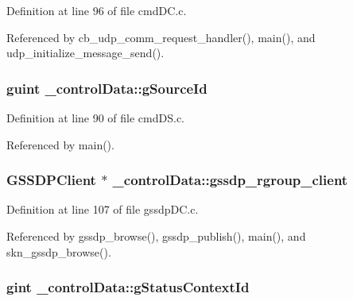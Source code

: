 Definition at line 96 of file cmd\+D\+C.\+c.



Referenced by cb\+\_\+udp\+\_\+comm\+\_\+request\+\_\+handler(), main(), and udp\+\_\+initialize\+\_\+message\+\_\+send().

\subsubsection[{\texorpdfstring{g\+Source\+Id}{gSourceId}}]{\setlength{\rightskip}{0pt plus 5cm}guint \+\_\+control\+Data\+::g\+Source\+Id}\hypertarget{struct__control_data_a719187f5c3c94da5aa08616db7820b98}{}\label{struct__control_data_a719187f5c3c94da5aa08616db7820b98}


Definition at line 90 of file cmd\+D\+S.\+c.



Referenced by main().

\subsubsection[{\texorpdfstring{gssdp\+\_\+rgroup\+\_\+client}{gssdp_rgroup_client}}]{\setlength{\rightskip}{0pt plus 5cm}G\+S\+S\+D\+P\+Client $\ast$ \+\_\+control\+Data\+::gssdp\+\_\+rgroup\+\_\+client}\hypertarget{struct__control_data_a05dec2c5c598d299306a41430093b6de}{}\label{struct__control_data_a05dec2c5c598d299306a41430093b6de}


Definition at line 107 of file gssdp\+D\+C.\+c.



Referenced by gssdp\+\_\+browse(), gssdp\+\_\+publish(), main(), and skn\+\_\+gssdp\+\_\+browse().

\subsubsection[{\texorpdfstring{g\+Status\+Context\+Id}{gStatusContextId}}]{\setlength{\rightskip}{0pt plus 5cm}gint \+\_\+control\+Data\+::g\+Status\+Context\+Id}\hypertarget{struct__control_data_aae36ce9466663c5765139bb92e9f8d49}{}\label{struct__control_data_aae36ce9466663c5765139bb92e9f8d49}


